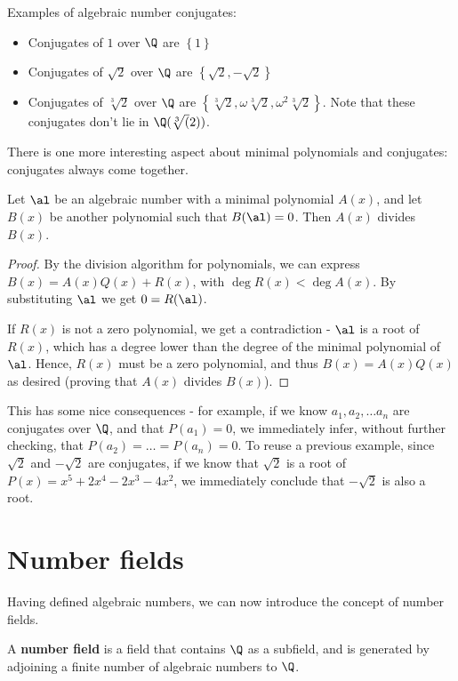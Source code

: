 \begin{ex} Examples of algebraic number conjugates:
\begin{itemize}
\item Conjugates of $1$ over $\Q$ are $\left\{1\right\}$
\item Conjugates of $\sqrt{2}$ over $\Q$ are $\left\{\sqrt{2}, -\sqrt{2}\right\}$
\item Conjugates of $\sqrt[3]{2}$ over $\Q$ are $\left\{\sqrt[3]{2}, \omega\sqrt[3]{2}, \omega^2\sqrt[3]{2}\right\}$. Note that these conjugates don't lie in $\Q(\sqrt[3](2))$.
\end{itemize}
\end{ex}

There is one more interesting aspect about minimal polynomials and conjugates: conjugates always come together.

\begin{thm}
Let $\al$ be an algebraic number with a minimal polynomial $A(x)$, and let $B(x)$ be another polynomial such that $B(\al) = 0$. Then $A(x)$ divides $B(x)$.
\end{thm}
\begin{proof}
By the division algorithm for polynomials, we can express $B(x) = A(x)Q(x) + R(x)$, with $\deg R(x) < \deg A(x)$. By substituting $\al$ we get $0 = R(\al)$.

\noindent If $R(x)$ is not a zero polynomial, we get a contradiction - $\al$ is a root of $R(x)$, which has a degree lower than the degree of the minimal polynomial of $\al$.
Hence, $R(x)$ must be a zero polynomial, and thus $B(x) = A(x)Q(x)$ as desired (proving that $A(x)$ divides $B(x)$).
\end{proof}

This has some nice consequences - for example, if we know $a_1, a_2, \ldots a_n$ are conjugates over $\Q$, and that $P(a_1) = 0$, we immediately infer, without further checking, that $P(a_2) = \ldots = P(a_n) = 0$.
To reuse a previous example, since $\sqrt{2}$ and $-\sqrt{2}$ are conjugates, if we know that $\sqrt{2}$ is a root of $P(x) = x^5 + 2x^4 - 2x^3 - 4x^2$, we immediately conclude that $-\sqrt{2}$ is also a root.

\section{Number fields}

Having defined algebraic numbers, we can now introduce the concept of number fields.

\begin{df}
A \textbf{number field} is a field that contains $\Q$ as a subfield, and is generated by adjoining a finite number of algebraic numbers to $\Q$.
\end{df}

